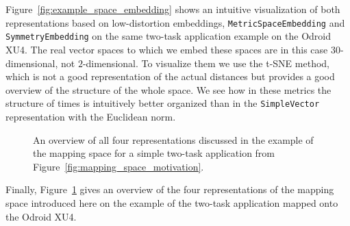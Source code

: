 Figure~\ref{fig:example_space_embedding} shows an intuitive visualization of both representations based on low-distortion embeddings, \texttt{MetricSpaceEmbedding} and \texttt{SymmetryEmbedding} on the same two-task application example on the Odroid XU4.
The real vector spaces to which we embed these spaces are in this case $30$-dimensional, not $2$-dimensional.
To visualize them we use the t-SNE\cite{tsne} method, which is not a good representation of the actual distances but provides a good overview of the structure of the whole space.
We see how in these metrics the structure of times is intuitively better organized than in the \texttt{SimpleVector} representation with the Euclidean norm. 

\begin{figure}[h]
	\centering
\resizebox{1.00\textwidth}{!}{
   \begin{tikzpicture}
     
   \end{tikzpicture}
 }
   \caption{An overview of all four representations discussed in the example of the mapping space for a simple two-task application from Figure~\ref{fig:mapping_space_motivation}.}
   \label{fig:mapping_space_full}
\end{figure}

Finally, Figure~\ref{fig:mapping_space_full} gives an overview of the four representations of the mapping space introduced here on the example of the two-task application mapped onto the Odroid XU4.